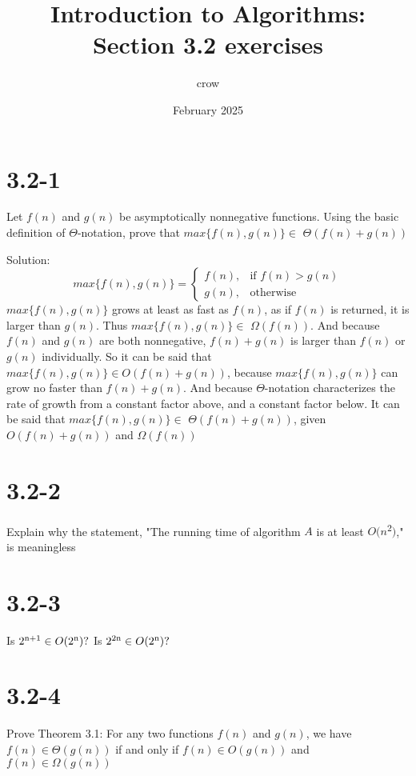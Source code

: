 \documentclass{article}
\title{Introduction to Algorithms: Section 3.2 exercises}
\author{crow}
\date{February 2025}
\begin{document}
\maketitle

\section{3.2-1}
\quad Let $f(n)$ and $g(n)$ be asymptotically nonnegative functions. Using the basic definition of $\Theta$-notation, prove that $max\{f(n),g(n)\} \in$ $\Theta$$(f(n) + g(n))$ \newline

Solution: 
\begin{equation}
    max\{f(n),g(n)\} =
        \begin{cases}
            f(n), & \text{if } f(n) > g(n)\\
            g(n), & \text{otherwise}
        \end{cases}
\end{equation}
\quad $max\{f(n),g(n)\}$ grows at least as fast as $f(n)$, as if $f(n)$ is returned, it is larger than $g(n)$. Thus $max\{f(n),g(n)\} \in$ $\Omega$$(f(n))$. And because $f(n)$ and $g(n)$ are both nonnegative, $f(n) + g(n)$ is larger than $f(n)$ or $g(n)$ individually. So it can be said that $max\{f(n),g(n)\} \in O(f(n) + g(n))$, because $max\{f(n),g(n)\}$ can grow no faster than $f(n) + g(n)$. And because $\Theta$-notation characterizes the rate of growth from a constant factor above, and a constant factor below. It can be said that $max\{f(n),g(n)\} \in$ $\Theta$$(f(n) + g(n))$, given $O(f(n) + g(n))$ and $\Omega$$(f(n))$

\section{3.2-2}
\quad Explain why the statement, "The running time of algorithm $A$ is at least $O(n$\textsuperscript{2}$)$," is meaningless

\section{3.2-3}
\quad Is $2\textsuperscript{n+1} \in O(2\textsuperscript{n})?$ Is $2\textsuperscript{2n} \in O(2\textsuperscript{n})?$

\section{3.2-4}
\quad Prove Theorem 3.1: \newline
For any two functions $f(n)$ and $g(n)$, we have $f(n) \in \Theta(g(n))$ if and only if $f(n) \in O(g(n))$ and $f(n) \in \Omega(g(n))$
\end{document}
